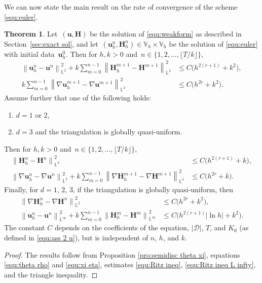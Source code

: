 \documentclass[11pt, reqno]{amsart}
\theoremstyle{definition}
\newtheorem{theorem}{Theorem}[section]
\theoremstyle{remark}
\numberwithin{equation}{section}
\newcommand{\bff}{\boldsymbol}
\newcommand{\bb}{\mathbb}
\newcommand{\norm}[2]{\left\|{#1}\right\|_{#2}}
\newcommand{\abs}[1]{\left|{#1}\right|}
\begin{document}
We can now state the main result on the rate of convergence of the scheme \eqref{equ:euler}.

\begin{theorem}\label{the:euler rate}
	Let~$(\bff{u},\bff{H})$ be the solution of \eqref{equ:weakform} as described in Section~\ref{sec:exact sol}, and let~$(\bff{u}_h^n,\bff{H}_h^n)\in \bb{V}_h\times \bb{V}_h$ be the solution of \eqref{equ:euler} with initial data~$\bff{u}_h^0$. Then for $h, k>0$ and~$n\in \{1,2,\ldots,\lfloor T/k \rfloor\}$,
	\begin{align*}
		\norm{\bff{u}_h^n - \bff{u}^n}{\bb{L}^2}^2
		+
		k \sum_{m=0}^{n-1} \norm{\bff{H}_h^{m+1} - \bff{H}^{m+1}}{\bb{L}^2}^2
		&\leq
		C \big(h^{2(r+1)}+k^2 \big),
		\\
		k \sum_{m=0}^{n-1} \norm{\nabla \bff{u}_h^{m+1} - \nabla \bff{u}^{m+1}}{\bb{L}^2}^2
		&\leq
		C \big(h^{2r}+k^2 \big).
	\end{align*}
	Assume further that one of the following holds:
	\begin{enumerate}
		\item $d=1$ or $2$,
		\item $d=3$ and the triangulation is globally quasi-uniform.
	\end{enumerate}
	Then for $h, k>0$ and~$n\in \{1,2,\ldots,\lfloor T/k \rfloor\}$,
	\begin{align*}
		\norm{\bff{H}_h^n-\bff{H}^n}{\bb{L}^2}^2
		&\leq
		C \big(h^{2(r+1)}+k \big),
		\\
		\norm{\nabla \bff{u}_h^n-\nabla \bff{u}^n}{\bb{L}^2}^2
		+
		k \sum_{m=0}^{n-1} \norm{\nabla\bff{H}_h^{m+1} - \nabla\bff{H}^{m+1}}{\bb{L}^2}^2
		&\leq
		C \big(h^{2r}+k \big).
	\end{align*}
	Finally, for $d=1$, $2$, $3$, if the triangulation is globally quasi-uniform, then
	\begin{align*}
		\norm{\nabla \bff{H}_h^n- \nabla \bff{H}^n}{\bb{L}^2}^2
		&\leq
		C \big(h^{2r}+k^2 \big),
		\\
		\norm{\bff{u}_h^n-\bff{u}^n}{\bb{L}^\infty}^2
		+
		k\sum_{m=0}^{n-1} \norm{\bff{H}_h^m- \bff{H}^m}{\bb{L}^\infty}^2
		&\leq
		C \big(h^{2(r+1)} \abs{\ln h} +k^2 \big).
	\end{align*}
	The constant $C$ depends on the coefficients of the equation, $|\mathscr{D}|$, $T$, and $K_0$ (as defined in \eqref{equ:ass 2 u}), but is independent of $n$, $h$, and $k$.
\end{theorem}

\begin{proof}
	The results follow from Proposition \ref{pro:semidisc theta xi}, equations \eqref{equ:theta rho} and \eqref{equ:xi eta}, estimates \eqref{equ:Ritz ineq}, \eqref{equ:Ritz ineq L infty}, and the triangle inequality.
\end{proof}
\end{document}
